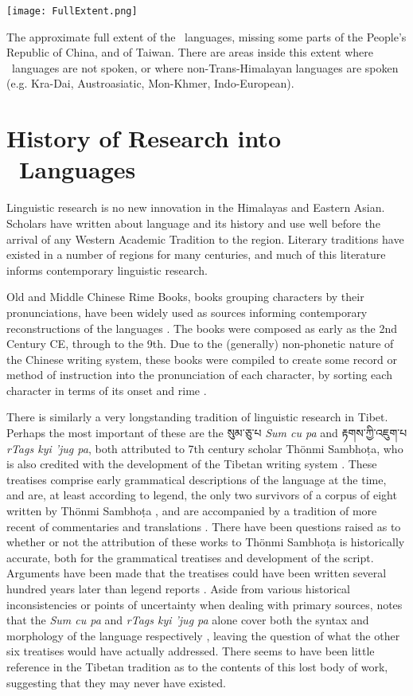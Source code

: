 \begin{map}
\centering
\texttt{[image: FullExtent.png]}
\caption{The approximate full extent of the \lfam\ languages, missing some parts of the People's Republic of China, and of Taiwan. There are areas inside this extent where \lfam\ languages are not spoken, or where non-Trans-Himalayan languages are spoken (e.g. Kra-Dai, Austroasiatic, Mon-Khmer, Indo-European).}
\label{fig:OverallMap}
\end{map}


\section{History of Research into \lfam\ Languages}\label{s:historyofresearch}
Linguistic research is no new innovation in the Himalayas and Eastern Asian. Scholars have written about language and its history and use well before the arrival of any Western Academic Tradition to the region. Literary traditions have existed in a number of regions for many centuries, and much of this literature informs contemporary linguistic research.

Old and Middle Chinese Rime Books, books grouping characters by their pronunciations, have been widely used as sources informing contemporary reconstructions of the languages \cite{Baxter1992}. The books were composed as early as the 2nd Century CE, through to the 9th. Due to the (generally) non-phonetic nature of the Chinese writing system, these books were compiled to create some record or method of instruction into the pronunciation of each character, by sorting each character in terms of its onset and rime \cite{Ji2021}.

There is similarly a very longstanding tradition of linguistic research in Tibet. Perhaps the most important of these are the \texttibetan{སུམ་ཅུ་པ} \textit{Sum cu pa} and \texttibetan{རྟགས་ཀྱི་འཇུག་པ} \textit{rTags kyi 'jug pa}, both attributed to 7th century scholar Thönmi Sambhoṭa, who is also credited with the development of the Tibetan writing system \cite{MuellerWitter2009}. These treatises comprise early grammatical descriptions of the language at the time, and are, at least according to legend, the only two survivors of a corpus of eight written by Thönmi Sambhoṭa \cite{Miller1963}, and are accompanied by a tradition of more recent of commentaries and translations \cite{Chashab2008}. There have been questions raised as to whether or not the attribution of these works to Thönmi Sambhoṭa is historically accurate, both for the grammatical treatises and development of the script. Arguments have been made that the treatises could have been written several hundred years later than legend reports \cite{Miller1963}. Aside from various historical inconsistencies or points of uncertainty when dealing with primary sources,  notes that the \textit{Sum cu pa} and \textit{rTags kyi 'jug pa} alone cover both the syntax and morphology of the language respectively \cite{Chashab2008}, leaving the question of what the other six treatises would have actually addressed. There seems to have been little reference in the Tibetan tradition as to the contents of this lost body of work, suggesting that they may never have existed.

